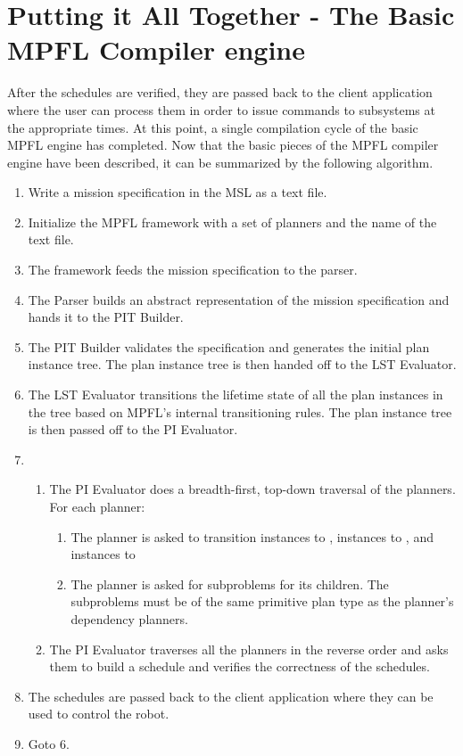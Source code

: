 \section{Putting it All Together - The Basic MPFL Compiler engine}
After the schedules are verified, they are passed back to the client application where the user can process them in order to issue commands to subsystems at the appropriate times. At this point, a single compilation cycle of the basic MPFL engine has completed. Now that the basic pieces of the MPFL compiler engine have been described, it can be summarized by the following algorithm.

\begin{enumerate}
\item Write a mission specification in the MSL as a text file.
\item Initialize the MPFL framework with a set of planners and the name of the text file.
\item The framework feeds the mission specification to the parser.
\item The Parser builds an abstract representation of the mission specification and hands it to the PIT Builder.
\item The PIT Builder validates the specification and generates the initial plan instance tree. The plan instance tree is then handed off to the LST Evaluator.
\item The LST Evaluator transitions the lifetime state of all the plan instances in the tree based on MPFL's internal transitioning rules. The plan instance tree is then passed off to the PI Evaluator.
\item\begin{enumerate}
	\item The PI Evaluator does a breadth-first, top-down traversal of the planners. For each planner:\begin{enumerate}
		\item The planner is asked to transition  instances to ,  instances to , and  instances to 
		\item The planner is asked for subproblems for its children. The subproblems must be of the same primitive plan type as the planner's dependency planners.
		\end{enumerate}
	\item The PI Evaluator traverses all the planners in the reverse order and asks them to build a schedule and verifies the correctness of the schedules.
	\end{enumerate}
\item The schedules are passed back to the client application where they can be used to control the robot.
\item Goto 6.
\end{enumerate}

